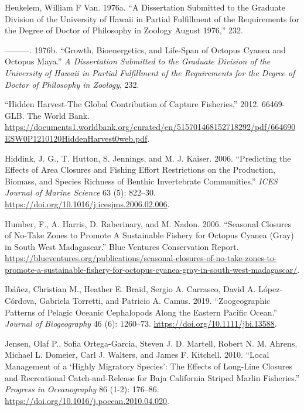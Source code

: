 \documentclass[
]{article}
\newlength{\cslhangindent}
\newlength{\cslentryspacingunit} %
\newenvironment{CSLReferences}[2] %
 {%
  \setlength{\parindent}{0pt}
  \ifodd #1
  \let\oldpar\par
  \def\par{\hangindent=\cslhangindent\oldpar}
  \fi
  \setlength{\parskip}{#2\cslentryspacingunit}
 }%
 {}
\begin{document}
\begin{CSLReferences}{1}{0}
\leavevmode{}%
Heukelem, William F Van. 1976a. {``A Dissertation Submitted to the Graduate Division of the {University} of {Hawaii} in Partial Fulfillment of the Requirements for the Degree of Doctor of Philosophy in Zoology {August} 1976,''} 232.

\leavevmode{}%
---------. 1976b. {``Growth, Bioenergetics, and Life-Span of {Octopus} Cyanea and {Octopus} Maya.''} \emph{A Dissertation Submitted to the Graduate Division of the University of Hawaii in Partial Fulfillment of the Requirements for the Degree of Doctor of Philosophy in Zoology}, 232.

\leavevmode{}%
{``Hidden {Harvest}-{The} {Global} {Contribution} of {Capture} {Fisheries}.''} 2012. 66469-GLB. The World Bank. \url{https://documents1.worldbank.org/curated/en/515701468152718292/pdf/664690ESW0P1210120HiddenHarvest0web.pdf}.

\leavevmode{}%
Hiddink, J. G., T. Hutton, S. Jennings, and M. J. Kaiser. 2006. {``Predicting the Effects of Area Closures and Fishing Effort Restrictions on the Production, Biomass, and Species Richness of Benthic Invertebrate Communities.''} \emph{ICES Journal of Marine Science} 63 (5): 822--30. \url{https://doi.org/10.1016/j.icesjms.2006.02.006}.

\leavevmode{}%
Humber, F., A. Harris, D. Raberinary, and M. Nadon. 2006. {``Seasonal {Closures} of {No}-{Take} {Zones} to Promote {A} {Sustainable} {Fishery} for {Octopus} {Cyanea} ({Gray}) in {South} {West} {Madagascar}.''} Blue Ventures Conservation Report. \url{https://blueventures.org/publications/seasonal-closures-of-no-take-zones-to-promote-a-sustainable-fishery-for-octopus-cyanea-gray-in-south-west-madagascar/}.

\leavevmode{}%
Ibáñez, Christian M., Heather E. Braid, Sergio A. Carrasco, David A. López‐Córdova, Gabriela Torretti, and Patricio A. Camus. 2019. {``Zoogeographic Patterns of Pelagic Oceanic Cephalopods Along the Eastern {Pacific} {Ocean}.''} \emph{Journal of Biogeography} 46 (6): 1260--73. \url{https://doi.org/10.1111/jbi.13588}.

\leavevmode{}%
Jensen, Olaf P., Sofia Ortega-Garcia, Steven J. D. Martell, Robert N. M. Ahrens, Michael L. Domeier, Carl J. Walters, and James F. Kitchell. 2010. {``Local Management of a {`Highly Migratory Species'}: {The} Effects of Long-Line Closures and Recreational Catch-and-Release for {Baja} {California} Striped Marlin Fisheries.''} \emph{Progress in Oceanography} 86 (1-2): 176--86. \url{https://doi.org/10.1016/j.pocean.2010.04.020}.


\end{CSLReferences}
\end{document}
